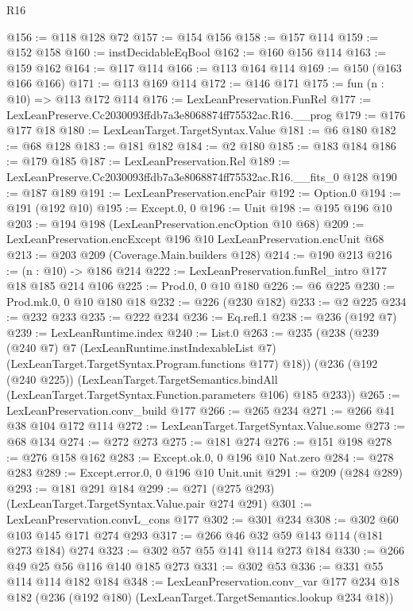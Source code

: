 \begin{lexlean}{R16}
\begin{coremodule}
@156 := @118 @128 @72
@157 := @154 @156
@158 := @157 @114
@159 := @152 @158
@160 := instDecidableEqBool
@162 := @160 @156 @114
@163 := @159 @162
@164 := @117 @114
@166 := @113 @164 @114
@169 := @150 (@163 @166 @166)
@171 := @113 @169 @114
@172 := @146 @171
@175 := fun (n : @10) => @113 @172 @114
@176 := LexLeanPreservation.FunRel
@177 := LexLeanPreserve.Cc2030093ffdb7a3e8068874ff75532ac.R16.__prog
@179 := @176 @177 @18
@180 := LexLeanTarget.TargetSyntax.Value
@181 := @6 @180
@182 := @68 @128
@183 := @181 @182
@184 := @2 @180
@185 := @183 @184
@186 := @179 @185
@187 := LexLeanPreservation.Rel
@189 := LexLeanPreserve.Cc2030093ffdb7a3e8068874ff75532ac.R16.__fits_0 @128
@190 := @187 @189
@191 := LexLeanPreservation.encPair
@192 := Option.{0}
@194 := @191 (@192 @10)
@195 := Except.{0, 0}
@196 := Unit
@198 := @195 @196 @10
@203 := @194 @198 (LexLeanPreservation.encOption @10 @68)
@209 := LexLeanPreservation.encExcept @196 @10 LexLeanPreservation.encUnit @68
@213 := @203 @209 (Coverage.Main.builders @128)
@214 := @190 @213
@216 := (n : @10) -> @186 @214
@222 := LexLeanPreservation.funRel_intro @177 @18 @185 @214 @106
@225 := Prod.{0, 0} @10 @180
@226 := @6 @225
@230 := Prod.mk.{0, 0} @10 @180 @18
@232 := @226 (@230 @182)
@233 := @2 @225
@234 := @232 @233
@235 := @222 @234
@236 := Eq.refl.{1}
@238 := @236 (@192 @7)
@239 := LexLeanRuntime.index
@240 := List.{0}
@263 := @235
    (@238
      (@239
        (@240 @7)
        @7
        (LexLeanRuntime.instIndexableList @7)
        (LexLeanTarget.TargetSyntax.Program.functions @177)
        @18))
    (@236
      (@192 (@240 @225))
      (LexLeanTarget.TargetSemantics.bindAll
        (LexLeanTarget.TargetSyntax.Function.parameters @106)
        @185
        @233))
@265 := LexLeanPreservation.conv_build @177
@266 := @265 @234
@271 := @266 @41 @38 @104 @172 @114
@272 := LexLeanTarget.TargetSyntax.Value.some
@273 := @68 @134
@274 := @272 @273
@275 := @181 @274
@276 := @151 @198
@278 := @276 @158 @162
@283 := Except.ok.{0, 0} @196 @10 Nat.zero
@284 := @278 @283
@289 := Except.error.{0, 0} @196 @10 Unit.unit
@291 := @209 (@284 @289)
@293 := @181 @291 @184
@299 := @271 (@275 @293) (LexLeanTarget.TargetSyntax.Value.pair @274 @291)
@301 := LexLeanPreservation.convL_cons @177
@302 := @301 @234
@308 := @302 @60 @103 @145 @171 @274 @293
@317 := @266 @46 @32 @59 @143 @114 (@181 @273 @184) @274
@323 := @302 @57 @55 @141 @114 @273 @184
@330 := @266 @49 @25 @56 @116 @140 @185 @273
@331 := @302 @53
@336 := @331 @55 @114 @114 @182 @184
@348 := LexLeanPreservation.conv_var
    @177
    @234
    @18
    @182
    (@236 (@192 @180) (LexLeanTarget.TargetSemantics.lookup @234 @18))

\end{coremodule}
\end{lexlean}
